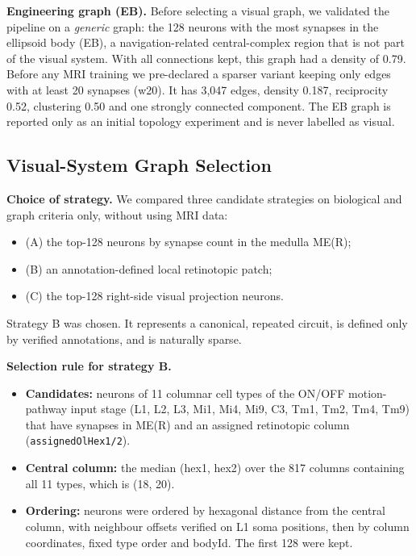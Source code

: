 \textbf{Engineering graph (EB).} Before selecting a visual graph, we validated the pipeline on a \emph{generic} graph: the 128 neurons with the most synapses in the ellipsoid body (EB), a navigation-related central-complex region that is not part of the visual system. With all connections kept, this graph had a density of 0.79. Before any MRI training we pre-declared a sparser variant keeping only edges with at least 20 synapses (w20). It has 3,047 edges, density 0.187, reciprocity 0.52, clustering 0.50 and one strongly connected component. The EB graph is reported only as an initial topology experiment and is never labelled as visual.

\subsection{Visual-System Graph Selection}

\textbf{Choice of strategy.} We compared three candidate strategies on biological and graph criteria only, without using MRI data:

\begin{itemize}
\item (A) the top-128 neurons by synapse count in the medulla ME(R);
\item (B) an annotation-defined local retinotopic patch;
\item (C) the top-128 right-side visual projection neurons.
\end{itemize}

Strategy B was chosen. It represents a canonical, repeated circuit, is defined only by verified annotations, and is naturally sparse.

\textbf{Selection rule for strategy B.}

\begin{itemize}
\item \textbf{Candidates:} neurons of 11 columnar cell types of the ON/OFF motion-pathway input stage (L1, L2, L3, Mi1, Mi4, Mi9, C3, Tm1, Tm2, Tm4, Tm9) that have synapses in ME(R) and an assigned retinotopic column (\texttt{assignedOlHex1/2}).
\item \textbf{Central column:} the median (hex1, hex2) over the 817 columns containing all 11 types, which is (18, 20).
\item \textbf{Ordering:} neurons were ordered by hexagonal distance from the central column, with neighbour offsets verified on L1 soma positions, then by column coordinates, fixed type order and bodyId. The first 128 were kept.
\end{itemize}

